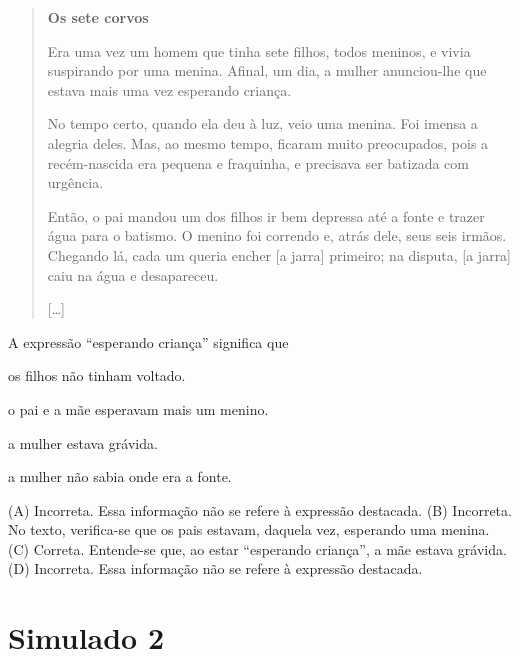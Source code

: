 \begin{quote}
\textbf{Os sete corvos}

Era uma vez um homem que tinha sete filhos, todos meninos, e vivia
suspirando por uma menina. Afinal, um dia, a mulher anunciou-lhe que
estava mais uma vez esperando criança.

No tempo certo, quando ela deu à luz, veio uma menina. Foi imensa a
alegria deles. Mas, ao mesmo tempo, ficaram muito preocupados, pois a
recém-nascida era pequena e fraquinha, e precisava ser batizada com
urgência.

Então, o pai mandou um dos filhos ir bem depressa até a fonte e trazer
água para o batismo. O menino foi correndo e, atrás dele, seus seis
irmãos. Chegando lá, cada um queria encher [a jarra] primeiro; na
disputa, [a jarra] caiu na água e desapareceu.

{[}\ldots{}{]}

\end{quote}

A expressão ``esperando criança'' significa que

\begin{escolha}
\item os filhos não tinham voltado.

\item o pai e a mãe esperavam mais um menino.

\item a mulher estava grávida.

\item a mulher não sabia onde era a fonte.
\end{escolha}


(A) Incorreta. Essa informação não se refere à expressão destacada.
(B) Incorreta. No texto, verifica-se que os pais estavam, daquela vez,
esperando uma menina.
(C) Correta. Entende-se que, ao estar ``esperando criança'', a mãe estava
grávida.
(D) Incorreta. Essa informação não se refere à expressão destacada.

\chapter{Simulado 2}

